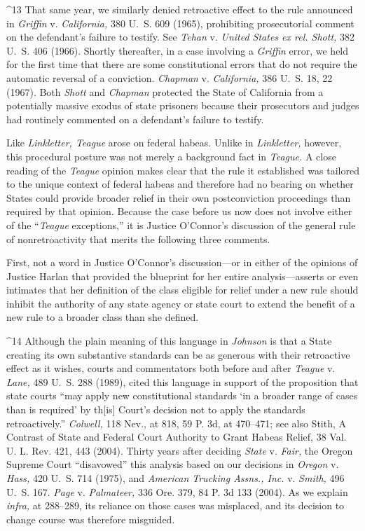 {{{^13 That same year, we similarly denied retroactive effect to the rule
announced in \emph{Griffin} v. \emph{California,} 380 U.~S. 609 (1965),
prohibiting prosecutorial comment on the defendant's failure to
testify. See \emph{Tehan} v. \emph{United States ex rel. Shott,} 382 U.~S.
406 (1966). Shortly thereafter, in a case involving a \emph{Griffin}
error, we held for the first time that there are some constitutional
errors that do not require the automatic reversal of a conviction.
\emph{Chapman} v. \emph{California,} 386 U.~S. 18, 22 (1967). Both
\emph{Shott} and \emph{Chapman} protected the State of California from a
potentially massive exodus of state prisoners because their prosecutors
and judges had routinely commented on a defendant's failure to
testify.

  Like \emph{Linkletter, Teague} arose on federal habeas. Unlike in
\emph{Linkletter,} however, this procedural posture was not merely a
background fact in \emph{Teague.} A close reading of the \emph{Teague} opinion
makes clear that the rule it established was tailored to the unique
context of federal habeas and therefore had no bearing on whether States
could provide broader relief in their own postconviction proceedings
than required by that opinion. Because the case before us now does
not involve either of the ``\emph{Teague} exceptions,'' it is Justice
O'Connor's discussion of the general rule of nonretroactivity that
merits the following three comments.

  First, not a word in Justice O'Connor's discussion---or in either
of the opinions of Justice Harlan that provided the blueprint for her
entire analysis---asserts or even intimates that her definition of the
class eligible for relief under a new rule should inhibit the authority
of any state agency or state \newpage  court to extend the benefit of a
new rule to a broader class than she defined.

^14 Although the plain meaning of this language in \emph{Johnson} is that
a State creating its own substantive standards can be as generous with
their retroactive effect as it wishes, courts and commentators both
before and after \emph{Teague} v. \emph{Lane,} 489 U.~S. 288 (1989),
cited this language in support of the proposition that state courts
``may apply new constitutional standards ‘in a broader range of
cases than is required' by th[is] Court's decision not to apply
the standards retroactively.'' \emph{Colwell,} 118 Nev., at 818, 59
P. 3d, at 470--471; see also Stith, A Contrast of State and Federal
Court Authority to Grant Habeas Relief, 38 Val. U. L. Rev. 421, 443
(2004). Thirty years after deciding \emph{State} v. \emph{Fair,} the Oregon
Supreme Court ``disavowed'' this analysis based on our decisions in
\emph{Oregon} v. \emph{Hass,} 420 U.~S. 714 (1975), and \emph{American
Trucking Assns., Inc.} v. \emph{Smith,} 496 U.~S. 167. \emph{Page}
v. \emph{Palmateer,} 336 Ore. 379, 84 P. 3d 133 (2004). As we explain
\emph{infra,} at 288--289, its reliance on those cases was misplaced, and
its decision to change course was therefore misguided.

}}}
